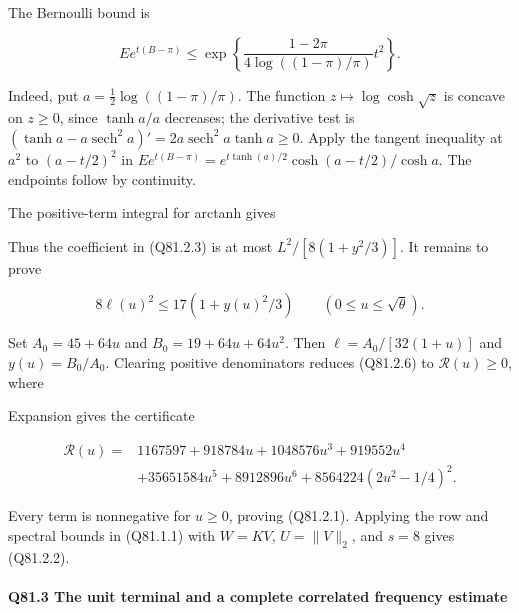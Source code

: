 The Bernoulli bound is

\begin{equation}\tag{Q81.2.5}\label{eq:Q102:3.5}
Ee^{t(B-\pi)}\le
\exp\left\{\frac{1-2\pi}{4\log((1-\pi)/\pi)}t^2\right\}.
\end{equation}

Indeed, put \(a=\frac12\log((1-\pi)/\pi)\). The function
\(z\mapsto\log\cosh\sqrt z\) is concave on \(z\ge0\), since
\(\tanh a/a\) decreases; the derivative test is
\((\tanh a-a\operatorname{sech}^2a)'=2a\operatorname{sech}^2a\tanh a\ge0\).
Apply the tangent inequality at \(a^2\) to \((a-t/2)^2\) in
\(Ee^{t(B-\pi)}=e^{t\tanh(a)/2}\cosh(a-t/2)/\cosh a\).
The endpoints follow by continuity.

The positive-term integral for arctanh gives


Thus the coefficient in (Q81.2.3) is at most
\(L^2/[8(1+y^2/3)]\). It remains to prove

\begin{equation}\tag{Q81.2.6}\label{eq:Q102:3.6}
8\ell(u)^2\le17(1+y(u)^2/3)
\qquad(0\le u\le\sqrt\theta).
\end{equation}

Set \(A_0=45+64u\) and \(B_0=19+64u+64u^2\). Then
\(\ell=A_0/[32(1+u)]\) and \(y(u)=B_0/A_0\). Clearing positive
denominators reduces (Q81.2.6) to \(\mathcal R(u)\ge0\), where


Expansion gives the certificate

\begin{equation}\tag{Q81.2.7}\label{eq:Q102:3.7}
\begin{aligned}
\mathcal R(u)={}&1167597+918784u+1048576u^3+919552u^4\\
&+35651584u^5+8912896u^6
+8564224(2u^2-1/4)^2.
\end{aligned}
\end{equation}

Every term is nonnegative for \(u\ge0\), proving (Q81.2.1).
Applying the row and spectral bounds in (Q81.1.1) with
\(W=KV\), \(U=\|V\|_2\), and \(s=8\) gives (Q81.2.2).

\paragraph{Q81.3 The unit terminal and a complete correlated frequency estimate}

